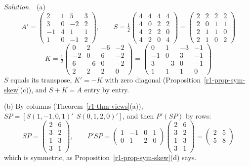 \documentclass[12pt]{article}
\theoremstyle{definition}
\newenvironment{solution}{\par\noindent\textit{Solution.}\ }{\par\smallskip}
\begin{document}
\begin{solution}
(a)
\[
A'=\begin{pmatrix}2&1&5&3\\3&0&-2&2\\-1&4&1&1\\1&0&-1&2\end{pmatrix},\qquad
S=\tfrac12\begin{pmatrix}4&4&4&4\\4&0&2&2\\4&2&2&0\\4&2&0&4\end{pmatrix}
=\begin{pmatrix}2&2&2&2\\2&0&1&1\\2&1&1&0\\2&1&0&2\end{pmatrix}
\]
\[
K=\tfrac12\begin{pmatrix}0&2&-6&-2\\-2&0&6&-2\\6&-6&0&-2\\2&2&2&0\end{pmatrix}
=\begin{pmatrix}0&1&-3&-1\\-1&0&3&-1\\3&-3&0&-1\\1&1&1&0\end{pmatrix}
\]
\(S\) equals its transpose, \(K'=-K\) with zero diagonal (Proposition~\ref{r1-prop-sym-skew}(c)), and
\(S+K=A\) entry by entry.

(b) By columns (Theorem~\ref{r1-thm-views}(a)), \(SP=[S(1,-1,0,1)'\ \ S(0,1,2,0)']\), and then \(P'(SP)\) by rows:
\[
SP=\begin{pmatrix}2&6\\3&2\\1&3\\3&1\end{pmatrix},\qquad
P'SP=\begin{pmatrix}1&-1&0&1\\0&1&2&0\end{pmatrix}\begin{pmatrix}2&6\\3&2\\1&3\\3&1\end{pmatrix}
=\begin{pmatrix}2&5\\5&8\end{pmatrix}
\]
which is symmetric, as Proposition~\ref{r1-prop-sym-skew}(d) says.
\end{solution}
\end{document}
